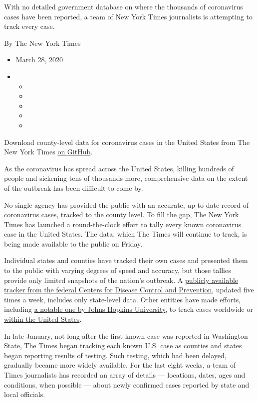 With no detailed government database on where the thousands of
coronavirus cases have been reported, a team of New York Times
journalists is attempting to track every case.

By The New York Times

\begin{itemize}
\item
  March 28, 2020
\item
  \begin{itemize}
  \item
  \item
  \item
  \item
  \item
  \end{itemize}
\end{itemize}

Download county-level data for coronavirus cases in the United States
from The New York Times
\href{https://github.com/nytimes/covid-19-data}{on GitHub}.

As the coronavirus has spread across the United States, killing hundreds
of people and sickening tens of thousands more, comprehensive data on
the extent of the outbreak has been difficult to come by.

No single agency has provided the public with an accurate, up-to-date
record of coronavirus cases, tracked to the county level. To fill the
gap, The New York Times has launched a round-the-clock effort to tally
every known coronavirus case in the United States. The data, which The
Times will continue to track, is being made available to the public on
Friday.

Individual states and counties have tracked their own cases and
presented them to the public with varying degrees of speed and accuracy,
but those tallies provide only limited snapshots of the nation's
outbreak. A
\href{https://www.cdc.gov/coronavirus/2019-ncov/cases-updates/cases-in-us.html}{publicly
available tracker from the federal Centers for Disease Control and
Prevention}, updated five times a week, includes only state-level data.
Other entities have made efforts, including
\href{https://www.arcgis.com/apps/opsdashboard/index.html\#/bda7594740fd40299423467b48e9ecf6}{a
notable one by Johns Hopkins University}, to track cases worldwide or
\href{https://coronavirus.1point3acres.com/en}{within the United
States}.

In late January, not long after the first known case was reported in
Washington State, The Times began tracking each known U.S. case as
counties and states began reporting results of testing. Such testing,
which had been delayed, gradually became more widely available. For the
last eight weeks, a team of Times journalists has recorded an array of
details --- locations, dates, ages and conditions, when possible ---
about newly confirmed cases reported by state and local officials.

